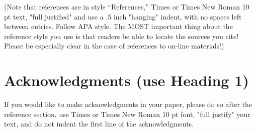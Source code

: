 \documentclass{ICLSarticle} %
\author{Author Name, Institution, Email \and Author Name 2, Institution, Email%

(if same institution, put all authors separated by commas, Institution,

then put on new line "Email: email 1, email 2, email 3" in order of authorship)
\vspace{-10ex}} %
\begin{document}
\maketitle
\begin{ICLSabstract}
\end{ICLSabstract}






\printbibliography[title={References (use Heading 1)}]


(Note that references are in style “References,” Times or Times New Roman 10 pt text, "full justified" and use a .5 inch "hanging" indent, with no spaces left between entries. Follow APA style. The MOST important thing about the reference style you use is that readers be able to locate the sources you cite! Please be especially clear in the case of references to on-line materials!)

\section{Acknowledgments (use Heading 1)}

If you would like to make acknowledgments in your paper, please do so after the reference section, use Times or Times New Roman 10 pt font, "full justify" your text, and do not indent the first line of the acknowledgments.
\end{document}
